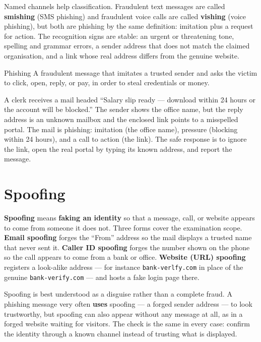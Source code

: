 Named channels help classification. Fraudulent text messages are called
\textbf{smishing} (SMS phishing) and fraudulent voice calls are called
\textbf{vishing} (voice phishing), but both are phishing by the same
definition: imitation plus a request for action. The recognition signs
are stable: an urgent or threatening tone, spelling and grammar errors,
a sender address that does not match the claimed organisation, and a
link whose real address differs from the genuine website.

\begin{definitionbox}{Phishing}
A fraudulent message that imitates a trusted sender and asks the victim
to click, open, reply, or pay, in order to steal credentials or money.
\end{definitionbox}

\begin{example}
A clerk receives a mail headed ``Salary slip ready --- download within
24 hours or the account will be blocked.'' The sender shows the office
name, but the reply address is an unknown mailbox and the enclosed
link points to a misspelled portal. The mail is phishing: imitation (the
office name), pressure (blocking within 24 hours), and a call to action
(the link). The safe response is to ignore the link, open the real
portal by typing its known address, and report the message.
\end{example}

\section{Spoofing}
\textbf{Spoofing} means \textbf{faking an identity} so that a message,
call, or website appears to come from someone it does not. Three forms
cover the examination scope. \textbf{Email spoofing} forges the
``From'' address so the mail displays a trusted name that never sent
it. \textbf{Caller ID spoofing} forges the number shown on the phone so
the call appears to come from a bank or office. \textbf{Website (URL)
spoofing} registers a look-alike address --- for instance
\texttt{bank-verlfy.com} in place of the genuine
\texttt{bank-verify.com} --- and hosts a fake login page there.

Spoofing is best understood as a disguise rather than a complete fraud.
A phishing message very often \textbf{uses} spoofing --- a forged
sender address --- to look trustworthy, but spoofing can also appear
without any message at all, as in a forged website waiting for
visitors. The check is the same in every case: confirm the identity
through a known channel instead of trusting what is displayed.

